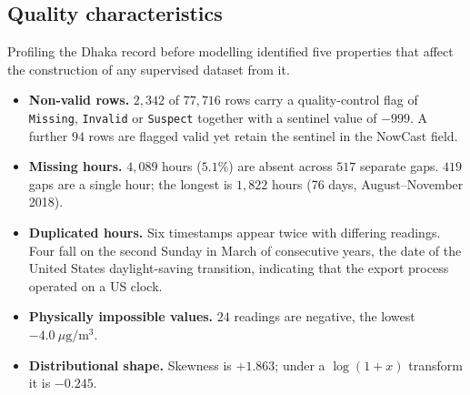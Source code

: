 \documentclass[conference,a4paper]{IEEEtran}
\begin{document}
\subsection{Quality characteristics}
Profiling the Dhaka record before modelling identified five properties that
affect the construction of any supervised dataset from it.

\begin{itemize}
\item \textbf{Non-valid rows.} $2{,}342$ of $77{,}716$ rows carry a
      quality-control flag of \texttt{Missing}, \texttt{Invalid} or
      \texttt{Suspect} together with a sentinel value of $-999$. A further
      $94$ rows are flagged valid yet retain the sentinel in the NowCast field.
\item \textbf{Missing hours.} $4{,}089$ hours ($5.1\%$) are absent across $517$
      separate gaps. $419$ gaps are a single hour; the longest is $1{,}822$
      hours (76 days, August--November 2018).
\item \textbf{Duplicated hours.} Six timestamps appear twice with differing
      readings. Four fall on the second Sunday in March of consecutive years,
      the date of the United States daylight-saving transition, indicating that
      the export process operated on a US clock.
\item \textbf{Physically impossible values.} $24$ readings are negative, the
      lowest $-4.0~\mu\mathrm{g/m^3}$.
\item \textbf{Distributional shape.} Skewness is $+1.863$; under a
      $\log(1+x)$ transform it is $-0.245$.
\end{itemize}
\end{document}
